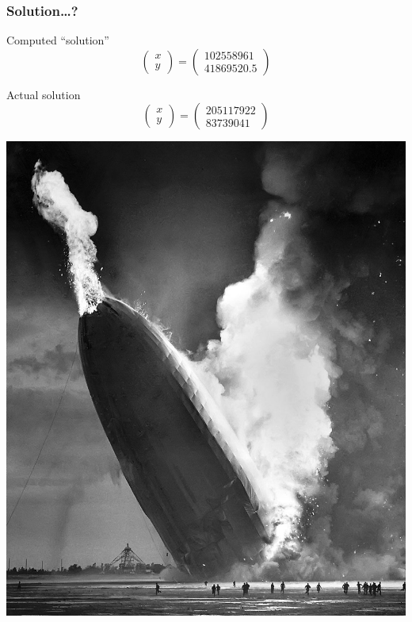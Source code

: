 \documentclass{beamer}
\begin{document}
\begin{frame}
    \frametitle{Solution\ldots?}

    Computed ``solution''
    \[
        \begin{pmatrix}
            x \\ y
        \end{pmatrix}
        =
        \begin{pmatrix}
            102558961 \\ 41869520.5
        \end{pmatrix}
    \]

    Actual solution
    \[
        \begin{pmatrix}
            x \\ y
        \end{pmatrix}
        =
        \begin{pmatrix}
            205117922 \\ 83739041
        \end{pmatrix}
    \]

\end{frame}

\begin{frame}
    \begin{center}
        \includegraphics[height=0.9\paperheight]{Hindenburg_disaster,_1937.jpg}
    \end{center}
\end{frame}
\end{document}
